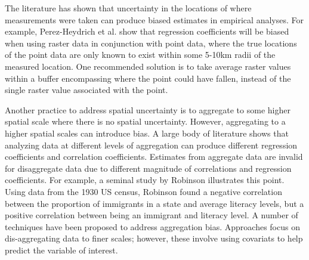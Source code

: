 The literature has shown that uncertainty in the locations of where measurements were taken can produce biased estimates in empirical analyses.\cite{perez-heydrich_guidelines_2013,rettie_overcoming_1999} For example, Perez-Heydrich et al. show that regression coefficients will be biased when using raster data in conjunction with point data, where the true locations of the point data are only known to exist within some 5-10km radii of the measured location.\cite{perez-heydrich_guidelines_2013} One recommended solution is to take average raster values within a buffer encompassing where the point could have fallen, instead of the single raster value associated with the point.\cite{perez-heydrich_guidelines_2013, rettie_overcoming_1999}
\par
Another practice to address spatial uncertainty is to aggregate to some higher spatial scale where there is no spatial uncertainty.\cite{perez-heydrich_guidelines_2013} However, aggregating to a higher spatial scales can introduce bias. 
A large body of literature shows that analyzing data at different levels of aggregation can produce different regression coefficients and correlation coefficients.\cite{clark_effects_1976, selvin_durkheims_1958, gotway_combining_2002, gehlke_certain_1934, cramer_efficient_1964} Estimates from aggregate data are invalid for disaggregate data due to different magnitude of correlations and regression coefficients. For example, a seminal study by Robinson illustrates this point. Using data from the 1930 US census, Robinson found a negative correlation between the proportion of immigrants in a state and average literacy levels, but a positive correlation between being an immigrant and literacy level.\cite{robinson_ecological_2009} A number of techniques have been proposed to address aggregation bias. Approaches focus on dis-aggregating data to finer scales; however, these involve using covariats to help predict the variable of interest.\cite{gotway_combining_2002, zhu_combined_2004} 




